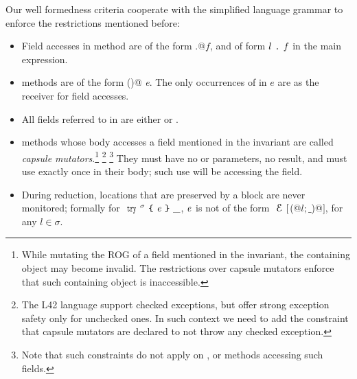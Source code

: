  Our well formedness criteria cooperate with the simplified language grammar to enforce the restrictions mentioned before:
\begin{itemize}
\item Field accesses in method are of the form
\Q@this.@$f$, and of form $l{ \mbox{ {\texttt{.}} } }\mathit{f}$ in the main expression.

\item \Q@invariant@ methods are of the form \Q@read@ \Q@method@ \Q@Bool@ \Q@invariant()@ \emph{e}.
The only occurrences of \Q@this@ in $e$ are as the receiver for field accesses.
\item All fields referred to in \Q@invariant@ are either \Q@imm@ or \Q@capsule@.
\item \Q@mut@ methods whose body accesses a \Q@capsule@ field mentioned in the invariant
are called \emph{capsule mutators}.\footnote{%
While mutating the ROG of a \Q@capsule@ field mentioned in the invariant, the containing object may become invalid.
The restrictions over capsule mutators
enforce that such containing object is inaccessible.
}%
\footnote{%
The L42 language support checked exceptions, but offer
strong exception safety only for unchecked ones. In such context
we need to add the constraint that capsule mutators are declared to not throw any checked exception.
}%
\footnote{%
Note that such constraints do not apply on \Q@capsule@, \Q@read@ or   \Q@imm@ methods accessing such fields.
}
They must have no \Q@mut@ or \Q@read@ parameters, no \Q@mut@ result, and 
must use \Q@this@ exactly once in their body; such use will be 
accessing the \Q@capsule@ field.
\item 
During reduction, locations that are preserved by a \Q@try@ block are
never monitored; formally 
for $\Kw{try}^\sigma\oC\e\cC\_$, ${\mathit{e}}$ is not of the form $\ctx[$\Q@M(@$l;\_$\Q@)@$]$, for any $l\in\sigma$.
\end{itemize}

\newcommand{\rowSpace}{\\\vspace{2.5ex}}

